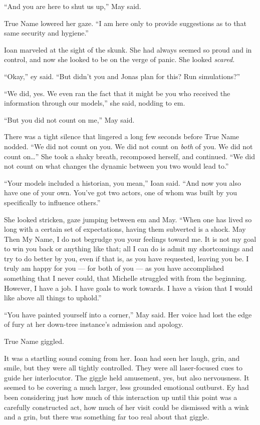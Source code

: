 ``And you are here to shut us up,'' May said.

True Name lowered her gaze. ``I am here only to provide suggestions as to that same security and hygiene.''

Ioan marveled at the sight of the skunk. She had always seemed so proud and in control, and now she looked to be on the verge of panic. She looked \emph{scared.}

``Okay,'' ey said. ``But didn't you and Jonas plan for this? Run simulations?''

``We did, yes. We even ran the fact that it might be you who received the information through our models,'' she said, nodding to em.

``But you did not count on me,'' May said.

There was a tight silence that lingered a long few seconds before True Name nodded. ``We did not count on you. We did not count on \emph{both} of you. We did not count on\ldots{}'' She took a shaky breath, recomposed herself, and continued. ``We did not count on what changes the dynamic between you two would lead to.''

``Your models included a historian, you mean,'' Ioan said. ``And now you also have one of your own. You've got two actors, one of whom was built by you specifically to influence others.''

She looked stricken, gaze jumping between em and May. ``When one has lived so long with a certain set of expectations, having them subverted is a shock. May Then My Name, I do not begrudge you your feelings toward me. It is not my goal to win you back or anything like that; all I can do is admit my shortcomings and try to do better by you, even if that is, as you have requested, leaving you be. I truly am happy for you — for both of you — as you have accomplished something that I never could, that Michelle struggled with from the beginning. However, I have a job. I have goals to work towards. I have a vision that I would like above all things to uphold.''

``You have painted yourself into a corner,'' May said. Her voice had lost the edge of fury at her down-tree instance's admission and apology.

True Name giggled.

It was a startling sound coming from her. Ioan had seen her laugh, grin, and smile, but they were all tightly controlled. They were all laser-focused cues to guide her interlocutor. The giggle held amusement, yes, but also nervousness. It seemed to be covering a much larger, less grounded emotional outburst. Ey had been considering just how much of this interaction up until this point was a carefully constructed act, how much of her visit could be dismissed with a wink and a grin, but there was something far too real about that giggle.

